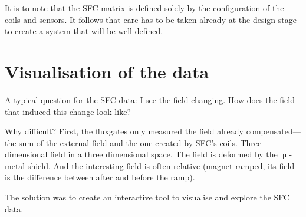 It is to note that the SFC matrix is defined solely by the configuration of the coils and sensors. It follows that care has to be taken already at the design stage to create a system that will be well defined.



\section{Visualisation of the data}
A typical question for the SFC data: I see the field changing. How does the field that induced this change look like?

Why difficult? First, the fluxgates only measured the field already compensated---the sum of the external field and the one created by SFC's coils. Three dimensional field in a three dimensional space. The field is deformed by the $\upmu$-metal shield. And the interesting field is often relative (magnet ramped, its field is the difference between after and before the ramp).

The solution was to create an interactive tool to visualise and explore the SFC data.

